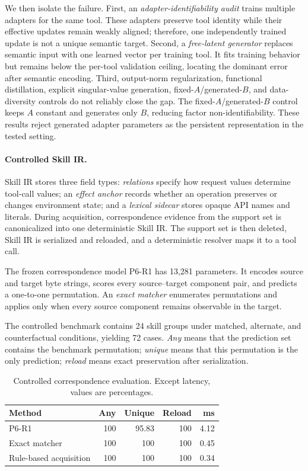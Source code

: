 \documentclass{article}
\begin{document}
We then isolate the failure. First, an \emph{adapter-identifiability audit} trains multiple adapters for the same tool. These adapters preserve tool identity while their effective updates remain weakly aligned; therefore, one independently trained update is not a unique semantic target. Second, a \emph{free-latent generator} replaces semantic input with one learned vector per training tool. It fits training behavior but remains below the per-tool validation ceiling, locating the dominant error after semantic encoding. Third, output-norm regularization, functional distillation, explicit singular-value generation, fixed-$A$/generated-$B$, and data-diversity controls do not reliably close the gap. The fixed-$A$/generated-$B$ control keeps $A$ constant and generates only $B$, reducing factor non-identifiability. These results reject generated adapter parameters as the persistent representation in the tested setting.

\paragraph{Controlled Skill IR.}
Skill IR stores three field types: \emph{relations} specify how request values determine tool-call values; an \emph{effect anchor} records whether an operation preserves or changes environment state; and a \emph{lexical sidecar} stores opaque API names and literals. During acquisition, correspondence evidence from the support set is canonicalized into one deterministic Skill IR. The support set is then deleted, Skill IR is serialized and reloaded, and a deterministic resolver maps it to a tool call.

The frozen correspondence model P6-R1 has 13,281 parameters. It encodes source and target byte strings, scores every source--target component pair, and predicts a one-to-one permutation. An \emph{exact matcher} enumerates permutations and applies only when every source component remains observable in the target.

The controlled benchmark contains 24 skill groups under matched, alternate, and counterfactual conditions, yielding 72 cases. \emph{Any} means that the prediction set contains the benchmark permutation; \emph{unique} means that this permutation is the only prediction; \emph{reload} means exact preservation after serialization.

\begin{table}[t]
\caption{Controlled correspondence evaluation. Except latency, values are percentages.}
\label{tab:correspondence}
\centering
\small
\begin{tabular}{lrrrr}
\toprule
Method & Any & Unique & Reload & ms \\
\midrule
P6-R1 & 100 & 95.83 & 100 & 4.12 \\
Exact matcher & 100 & 100 & 100 & 0.45 \\
Rule-based acquisition & 100 & 100 & 100 & 0.34 \\
\bottomrule
\end{tabular}
\end{table}
\end{document}
